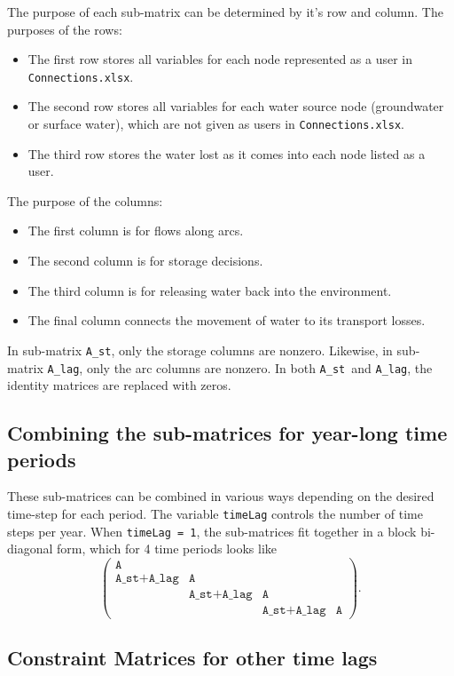 \documentclass[11pt]{article}
\newcommand{\connections}{\texttt{Connections.xlsx}}
\newcommand{\A}{\texttt{A}}
\newcommand{\Ast}{\texttt{A\_st}}
\newcommand{\Alag}{\texttt{A\_lag}}
\begin{document}
The purpose of each sub-matrix can be determined by it's row and column.
The purposes of the rows:
\begin{itemize}
	\item The first row stores all variables for each node represented as a user in \connections.
	\item The second row stores all variables for each water source node (groundwater or surface water), which are not given as users in \connections.
	\item The third row stores the water lost as it comes into each node listed as a user.
\end{itemize}

The purpose of the columns:
\begin{itemize}
	\item The first column is for flows along arcs.
	\item The second column is for storage decisions.
	\item The third column is for releasing water back into the environment.
	\item The final column connects the movement of water to its transport losses.
\end{itemize}

In sub-matrix \Ast, only the storage columns are nonzero.
Likewise, in sub-matrix \Alag, only the arc columns are nonzero.
In both \Ast\ and \Alag, the identity matrices are replaced with zeros.

\subsection{Combining the sub-matrices for year-long time periods}
\label{ssec:yearlag}

These sub-matrices can be combined in various ways depending on the desired time-step for each period.
The variable \texttt{timeLag} controls the number of time steps per year.
When \texttt{timeLag = 1}, the sub-matrices fit together in a block bi-diagonal form, which for 4 time periods looks like
\[
	\left(
	\begin{array}{cccc}
		\A         &            &            &    \\
		\Ast+\Alag & \A         &            &    \\
					  & \Ast+\Alag & \A         &    \\
					  &            & \Ast+\Alag & \A 
	\end{array}
	\right).
\]

\subsection{Constraint Matrices for other time lags}
\label{ssec:otherlag}
\end{document}
